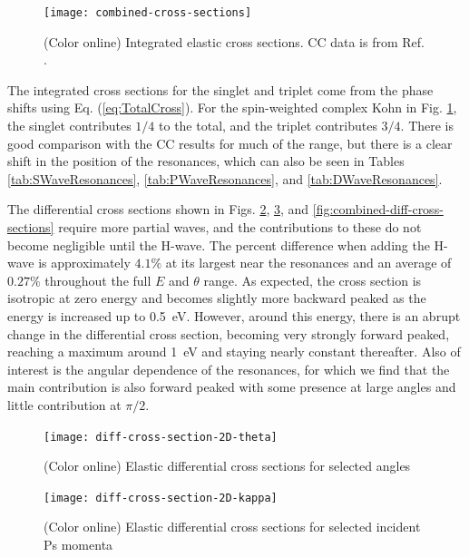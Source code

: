 \documentclass[preprint,showpacs,preprintnumbers,amsmath,amssymb,longbibliography,pra,aps]{revtex4-1}
\begin{document}
\begin{figure}[H]
	\centering
	\texttt{[image: combined-cross-sections]}
	\caption{(Color online) Integrated elastic cross sections. CC data is from Ref. \cite{Walters2004}.}
	\label{fig:combined-cross-sections}
\end{figure}

The integrated cross sections for the singlet and triplet come from the phase shifts using Eq. (\ref{eq:TotalCross}). For the spin-weighted complex Kohn in Fig. \ref{fig:combined-cross-sections}, the singlet contributes $1/4$ to the total, and the triplet contributes $3/4$. There is good comparison with the CC results \cite{Walters2004} for much of the range, but there is a clear shift in the position of the resonances, which can also be seen in Tables \ref{tab:SWaveResonances}, \ref{tab:PWaveResonances}, and \ref{tab:DWaveResonances}.

The differential cross sections shown in Figs. \ref{fig:diff-cross-section-2D-theta}, \ref{fig:diff-cross-section-2D-kappa}, and \ref{fig:combined-diff-cross-sections} require more partial waves, and the contributions to these do not become negligible until the H-wave. The percent difference when adding the H-wave is approximately $4.1\%$ at its largest near the resonances and an average of $0.27\%$ throughout the full $E$ and $\theta$ range. As expected, the cross section is isotropic at zero energy and becomes slightly more backward peaked as the energy is increased up to \mbox{0.5 eV}. However, around this energy, there is an abrupt change in the differential cross section, becoming very strongly forward peaked, reaching a maximum around \mbox{1 eV} and staying nearly constant thereafter. Also of interest is the angular dependence of the resonances, for which we find that the main contribution is also forward peaked with some presence at large angles and little contribution at $\pi/2$.

\begin{figure}[H]
	\centering
	\texttt{[image: diff-cross-section-2D-theta]}
	\caption{(Color online) Elastic differential cross sections for selected angles}
	\label{fig:diff-cross-section-2D-theta}
\end{figure}

\begin{figure}[H]
	\centering
	\texttt{[image: diff-cross-section-2D-kappa]}
	\caption{(Color online) Elastic differential cross sections for selected incident Ps momenta}
	\label{fig:diff-cross-section-2D-kappa}
\end{figure}
\end{document}
